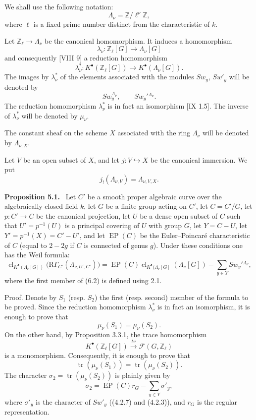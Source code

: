 \documentclass[11pt]{article}
\newenvironment{statement}[1]{\par\medskip\noindent\textbf{#1.}\ }{\par\medskip}
\providecommand{\EP}{\operatorname{EP}}
\providecommand{\EP}{\operatorname{EP}}
\providecommand{\clKstar}[1]{\operatorname{cl}_{K^{\bullet}(#1)}}
\providecommand{\RG}{\mathrm R\Gamma}
\begin{document}
We shall use the following notation:
\[
\Lambda_\nu=\mathbb Z/\ell^\nu\mathbb Z,
\]
where $\ell$ is a fixed prime number distinct from the characteristic of $k$.

Let $\mathbb Z_\ell\to\Lambda_\nu$ be the canonical homomorphism. It induces a homomorphism
\[
\lambda_\nu:\mathbb Z_\ell[G]\longrightarrow \Lambda_\nu[G]
\]
and consequently [VIII 9] a reduction homomorphism
\[
\lambda_\nu^*:K^{\bullet}(\mathbb Z_\ell[G])\longrightarrow K^{\bullet}(\Lambda_\nu[G]).
\]
The images by $\lambda_\nu^*$ of the elements associated with the modules $Sw_y$, $Sw'_y$ will be denoted by
\[
Sw_y^{\Lambda_\nu},\qquad Sw_y'{}^{\Lambda_\nu}.
\]
The reduction homomorphism $\lambda_\nu^*$ is in fact an isomorphism [IX 1.5]. The inverse of $\lambda_\nu^*$ will be denoted by $\mu_\nu$.

The constant sheaf on the scheme $X$ associated with the ring $\Lambda_\nu$ will be denoted by $\Lambda_{\nu,X}$.

Let $V$ be an open subset of $X$, and let $j:V\hookrightarrow X$ be the canonical immersion. We put
\[
j_!(\Lambda_{\nu,V})=\Lambda_{\nu,V,X}.
\]

\begin{statement}{Proposition 5.1}
Let $C'$ be a smooth proper algebraic curve over the algebraically closed field $k$, let $G$ be a finite group acting on $C'$, let $C=C'/G$, let $p:C'\to C$ be the canonical projection, let $U$ be a dense open subset of $C$ such that $U'=p^{-1}(U)$ is a principal covering of $U$ with group $G$, let $Y=C-U$, let $Y'=p^{-1}(X)=C'-U'$, and let $\EP(C)$ be the Euler--Poincaré characteristic of $C$ (equal to $2-2g$ if $C$ is connected of genus $g$).
Under these conditions one has the Weil formula:
\[
\clKstar{\Lambda_\nu[G]}\bigl(\RG_{C'}(\Lambda_{\nu,U',C'})\bigr)
=
\EP(C)\operatorname{cl}_{K^{\bullet}(\Lambda_\nu[G]}(\Lambda_\nu[G])
-\sum_{y\in Y}Sw_y'{}^{\Lambda_\nu},
\tag{5.2}
\]
where the first member of (6.2) is defined using 2.1.
\end{statement}

Proof. Denote by $S_1$ (resp. $S_2$) the first (resp. second) member of the formula to be proved. Since the reduction homomorphism $\lambda_\nu^*$ is in fact an isomorphism, it is enough to prove that
\[
\mu_\nu(S_1)=\mu_\nu(S_2).
\]
On the other hand, by Proposition 3.3.1, the trace homomorphism
\[
K^{\bullet}(\mathbb Z_\ell[G])\xrightarrow{\ tv\ }\mathcal F(G,\mathbb Z_\ell)
\]
is a monomorphism. Consequently, it is enough to prove that
\[
\operatorname{tr}(\mu_\nu(S_1))=\operatorname{tr}(\mu_\nu(S_2)).
\]
The character $\sigma_2=\operatorname{tr}(\mu_\nu(S_2))$ is plainly given by
\[
\sigma_2=\EP(C)r_G-\sum_{y\in Y}\sigma'_y,
\tag{5.2.1}
\]
where $\sigma'_y$ is the character of $Sw'_y$ ((4.2.7) and (4.2.3)), and $r_G$ is the regular representation.
\end{document}
